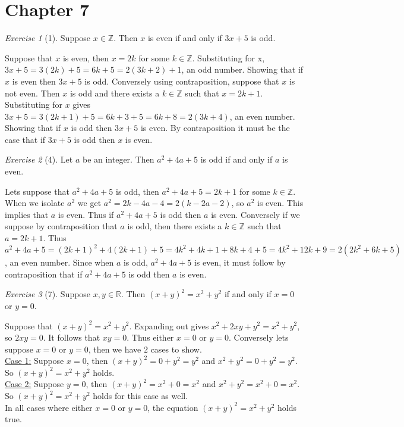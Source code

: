 \documentclass[12pt]{amsart}
\makeatletter
\theoremstyle{remark}
\newtheorem*{exercise}{Exercise}%
\def\RR{\ensuremath{\mathbb R}}
\def\ZZ{\ensuremath{\mathbb Z}}
\renewenvironment{proof}[1][\proofname]{\par\doublespacing
  \pushQED{\qed}%
  \normalfont \topsep6\p@\@plus6\p@\relax
  \list{}{%
    \settowidth{\leftmargin}{\itshape\proofname:\hskip\labelsep}%
    \setlength{\labelwidth}{0pt}%
    \setlength{\itemindent}{-\leftmargin}%
  }%
  \item[\hskip\labelsep\itshape#1\@addpunct{:}]\ignorespaces
}{%
  \popQED\endlist\@endpefalse
  \singlespacing
}
\theoremstyle{mycomment}
\makeatother
\begin{document}
\section*{Chapter 7}
\begin{exercise}[1] Suppose $x\in\ZZ$. Then $x$ is even if and only if $3x+5$ is odd.
\begin{proof}
Suppose that $x$ is even, then $x = 2k$ for some $k\in\ZZ$. Substituting for x, $3x + 5 = 3(2k) + 5 = 6k + 5 = 2(3k + 2) + 1$, an odd number. Showing that if $x$ is even then $3x + 5$ is odd. Conversely using contraposition, suppose that $x$ is not even. Then $x$ is odd and there exists a $k\in\ZZ$ such that $x=2k+1$. Substituting for $x$ gives $3x + 5 = 3(2k+1) + 5 = 6k+ 3 + 5 = 6k + 8 = 2(3k+4)$, an even number. Showing that if $x$ is odd then $3x+5$ is even. By contraposition it must be the case that if $3x+5$ is odd then $x$ is even.
\end{proof}
\end{exercise}
\begin{exercise}[4] Let $a$ be an integer. Then $a^{2}+4a+5$ is odd if and only if $a$ is even.
\begin{proof}
Lets suppose that $a^2 + 4a + 5$ is odd, then $a^2 + 4a + 5 = 2k+1$ for some $k\in\ZZ$. When we isolate $a^2$ we get $a^2 = 2k - 4a - 4 = 2(k-2a-2)$, so $a^2$ is even. This implies that $a$ is even. Thus if $a^2 + 4a + 5$ is odd then $a$ is even. Conversely if we suppose by contraposition that $a$ is odd, then there exists a $k\in\ZZ$ such that $a = 2k+1$. Thus $a^2 +4a + 5 = (2k+1)^2 + 4(2k+1) + 5 = 4k^2 + 4k + 1 + 8k + 4 + 5 = 4k^2 + 12k + 9 = 2(2k^2 + 6k + 5)$, an even number. Since when $a$ is odd, $a^2 + 4a + 5$ is even, it must follow by contraposition that if $a^2 + 4a + 5$ is odd then $a$ is even. \end{proof}
\end{exercise}
\begin{exercise}[7] Suppose $x,y\in\RR$. Then $(x+y)^{2}=x^{2}+y^{2}$ if and only if $x=0$ or $y=0$.
\begin{proof}
Suppose that $(x+y)^2 = x^2 + y^2$. Expanding out gives $x^2 + 2xy + y^2 = x^2 + y^2$, so $2xy = 0$. It follows that $xy = 0$. Thus either $x=0$ or $y= 0$. Conversely lets suppose $x=0$ or $y=0$, then we have $2$ cases to show. \\
\underline{Case 1:} Suppose $x = 0$, then $(x+y)^2 = 0 + y^2 = y^2$ and $x^2 + y^2 =  0 + y^2 = y^2$. So $(x+y)^2 = x^2 + y^2$ holds. \\
\underline{Case 2:} Suppose $y = 0$, then $(x+y)^2 = x^2 + 0 = x^2$ and $x^2 + y^2 = x^2 + 0 = x^2$. So $(x+y)^2 = x^2 + y^2$ holds for this case as well.\\
In all cases where either $x = 0$ or $y = 0$, the equation $(x+y)^2 = x^2 + y^2$ holds true.
\end{proof}
\end{exercise}
\end{document}

